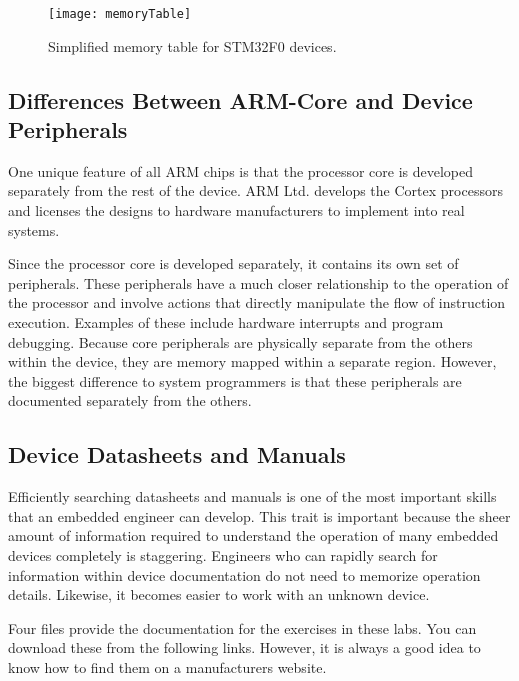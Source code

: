 \documentclass[11pt,fleqn]{book} %
\begin{document}
\begin{figure}[]
    \centering\texttt{[image: memoryTable]}
    \caption{Simplified memory table for STM32F0 devices.}
    \label{memoryTable}
\end{figure}


\subsection{Differences Between ARM-Core and Device Peripherals}

One unique feature of all ARM chips is that the processor core is developed separately from the rest of the device. ARM Ltd. develops the Cortex processors and licenses the designs to hardware manufacturers to implement into real systems. 

Since the processor core is developed separately, it contains its own set of peripherals. These peripherals have a much closer relationship to the operation of the processor and involve actions that directly manipulate the flow of instruction execution. Examples of these include hardware interrupts and program debugging. Because core peripherals are physically separate from the others within the device, they are memory mapped within a separate region. However, the biggest difference to system programmers is that these peripherals are documented separately from the others.

\subsection{Device Datasheets and Manuals}

Efficiently searching datasheets and manuals is one of the most important skills that an embedded engineer can develop. This trait is important because the sheer amount of information required to understand the operation of many embedded devices completely is staggering. 
Engineers who can rapidly search for information within device documentation do not need to memorize operation details. Likewise, it becomes easier to work with an unknown device. 

Four files provide the documentation for the exercises in these labs. You can download these from the following links. However, it is always a good idea to know how to find them on a manufacturers website.
\end{document}
